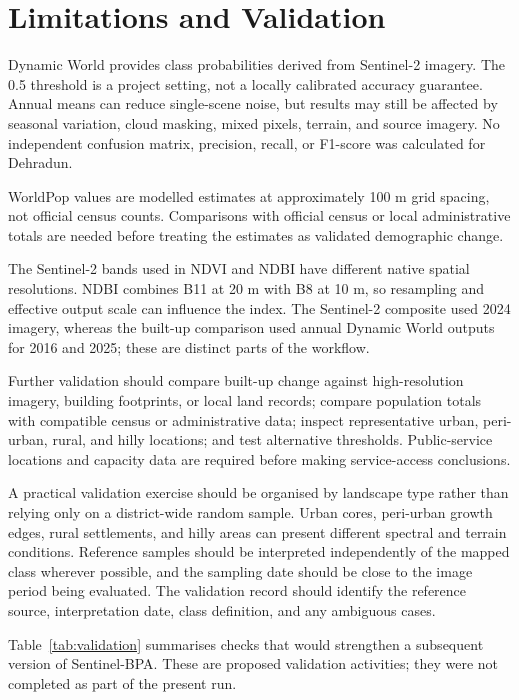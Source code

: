 \documentclass[conference]{IEEEtran}
\begin{document}
\section{Limitations and Validation}
Dynamic World provides class probabilities derived from Sentinel-2 imagery. The 0.5 threshold is a project setting, not a locally calibrated accuracy guarantee. Annual means can reduce single-scene noise, but results may still be affected by seasonal variation, cloud masking, mixed pixels, terrain, and source imagery. No independent confusion matrix, precision, recall, or F1-score was calculated for Dehradun.

WorldPop values are modelled estimates at approximately 100 m grid spacing, not official census counts. Comparisons with official census or local administrative totals are needed before treating the estimates as validated demographic change.

The Sentinel-2 bands used in NDVI and NDBI have different native spatial resolutions. NDBI combines B11 at 20 m with B8 at 10 m, so resampling and effective output scale can influence the index. The Sentinel-2 composite used 2024 imagery, whereas the built-up comparison used annual Dynamic World outputs for 2016 and 2025; these are distinct parts of the workflow.

Further validation should compare built-up change against high-resolution imagery, building footprints, or local land records; compare population totals with compatible census or administrative data; inspect representative urban, peri-urban, rural, and hilly locations; and test alternative thresholds. Public-service locations and capacity data are required before making service-access conclusions.

A practical validation exercise should be organised by landscape type rather than relying only on a district-wide random sample. Urban cores, peri-urban growth edges, rural settlements, and hilly areas can present different spectral and terrain conditions. Reference samples should be interpreted independently of the mapped class wherever possible, and the sampling date should be close to the image period being evaluated. The validation record should identify the reference source, interpretation date, class definition, and any ambiguous cases.

Table~\ref{tab:validation} summarises checks that would strengthen a subsequent version of Sentinel-BPA. These are proposed validation activities; they were not completed as part of the present run.
\end{document}
